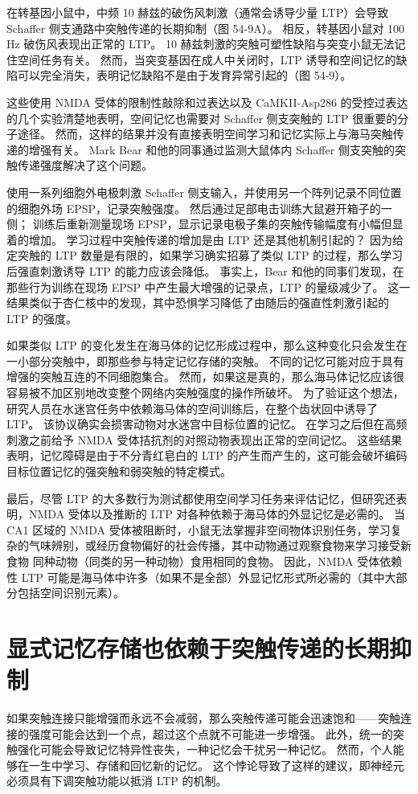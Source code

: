 在转基因小鼠中，中频 10 赫兹的破伤风刺激（通常会诱导少量 LTP）会导致 Schaffer 侧支通路中突触传递的长期抑制（图 54-9A）。 相反，转基因小鼠对 100 Hz 破伤风表现出正常的 LTP。 10 赫兹刺激的突触可塑性缺陷与突变小鼠无法记住空间任务有关。 然而，当突变基因在成人中关闭时，LTP 诱导和空间记忆的缺陷可以完全消失，表明记忆缺陷不是由于发育异常引起的（图 54-9）。

这些使用 NMDA 受体的限制性敲除和过表达以及 CaMKII-Asp286 的受控过表达的几个实验清楚地表明，空间记忆也需要对 Schaffer 侧支突触的 LTP 很重要的分子途径。 然而，这样的结果并没有直接表明空间学习和记忆实际上与海马突触传递的增强有关。 Mark Bear 和他的同事通过监测大鼠体内 Schaffer 侧支突触的突触传递强度解决了这个问题。

使用一系列细胞外电极刺激 Schaffer 侧支输入，并使用另一个阵列记录不同位置的细胞外场 EPSP，记录突触强度。 然后通过足部电击训练大鼠避开箱子的一侧； 训练后重新测量现场 EPSP，显示记录电极子集的突触传输幅度有小幅但显着的增加。 学习过程中突触传递的增加是由 LTP 还是其他机制引起的？ 因为给定突触的 LTP 数量是有限的，如果学习确实招募了类似 LTP 的过程，那么学习后强直刺激诱导 LTP 的能力应该会降低。 事实上，Bear 和他的同事们发现，在那些行为训练在现场 EPSP 中产生最大增强的记录点，LTP 的量级减少了。 这一结果类似于杏仁核中的发现，其中恐惧学习降低了由随后的强直性刺激引起的 LTP 的强度。

如果类似 LTP 的变化发生在海马体的记忆形成过程中，那么这种变化只会发生在一小部分突触中，即那些参与特定记忆存储的突触。 不同的记忆可能对应于具有增强的突触互连的不同细胞集合。 然而，如果这是真的，那么海马体记忆应该很容易被不加区别地改变整个网络内突触强度的操作所破坏。 为了验证这个想法，研究人员在水迷宫任务中依赖海马体的空间训练后，在整个齿状回中诱导了 LTP。 该协议确实会损害动物对水迷宫中目标位置的记忆。 在学习之后但在高频刺激之前给予 NMDA 受体拮抗剂的对照动物表现出正常的空间记忆。 这些结果表明，记忆障碍是由于不分青红皂白的 LTP 的产生而产生的，这可能会破坏编码目标位置记忆的强突触和弱突触的特定模式。

最后，尽管 LTP 的大多数行为测试都使用空间学习任务来评估记忆，但研究还表明，NMDA 受体以及推断的 LTP 对各种依赖于海马体的外显记忆是必需的。 当 CA1 区域的 NMDA 受体被阻断时，小鼠无法掌握非空间物体识别任务，学习复杂的气味辨别，或经历食物偏好的社会传播，其中动物通过观察食物来学习接受新食物 同种动物（同类的另一种动物）食用相同的食物。 因此，NMDA 受体依赖性 LTP 可能是海马体中许多（如果不是全部）外显记忆形式所必需的（其中大部分包括空间识别元素）。

\section{显式记忆存储也依赖于突触传递的长期抑制}
如果突触连接只能增强而永远不会减弱，那么突触传递可能会迅速饱和——突触连接的强度可能会达到一个点，超过这个点就不可能进一步增强。 此外，统一的突触强化可能会导致记忆特异性丧失，一种记忆会干扰另一种记忆。 然而，个人能够在一生中学习、存储和回忆新的记忆。 这个悖论导致了这样的建议，即神经元必须具有下调突触功能以抵消 LTP 的机制。

